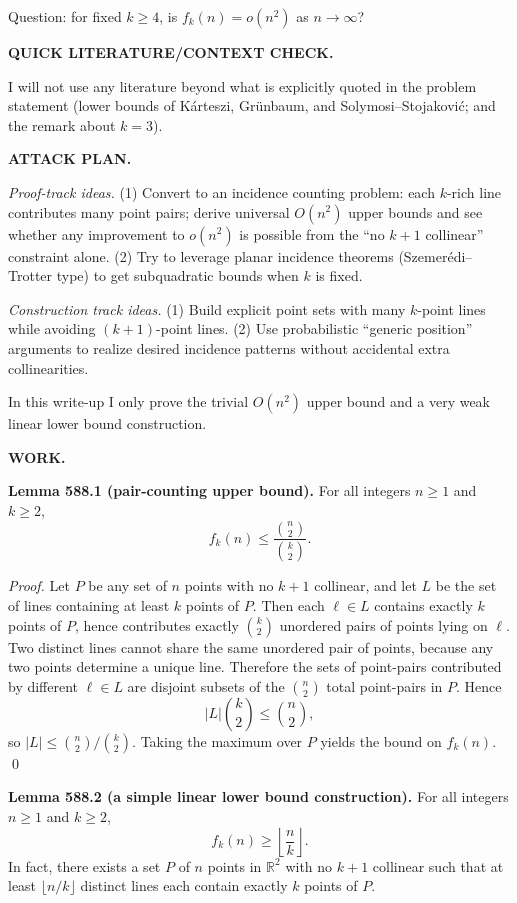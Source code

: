 Question: for fixed $k\ge 4$, is $f_k(n)=o(n^2)$ as $n\to\infty$?

\bigskip
\noindent\textbf{QUICK LITERATURE/CONTEXT CHECK.}

I will not use any literature beyond what is explicitly quoted in the problem statement (lower bounds of K\'arteszi, Gr\"unbaum, and Solymosi--Stojakovi\'c; and the remark about $k=3$).

\bigskip
\noindent\textbf{ATTACK PLAN.}

\emph{Proof-track ideas.}
(1) Convert to an incidence counting problem: each $k$-rich line contributes many point pairs; derive universal $O(n^2)$ upper bounds and see whether any improvement to $o(n^2)$ is possible from the ``no $k+1$ collinear'' constraint alone.
(2) Try to leverage planar incidence theorems (Szemer\'edi--Trotter type) to get subquadratic bounds when $k$ is fixed.

\emph{Construction track ideas.}
(1) Build explicit point sets with many $k$-point lines while avoiding $(k+1)$-point lines.
(2) Use probabilistic ``generic position'' arguments to realize desired incidence patterns without accidental extra collinearities.

In this write-up I only prove the trivial $O(n^2)$ upper bound and a very weak linear lower bound construction.

\bigskip
\noindent\textbf{WORK.}

\noindent\textbf{Lemma 588.1 (pair-counting upper bound).}
For all integers $n\ge 1$ and $k\ge 2$,
\[
 f_k(n)\le \frac{\binom{n}{2}}{\binom{k}{2}}.
\]

\noindent\emph{Proof.}
Let $P$ be any set of $n$ points with no $k+1$ collinear, and let $L$ be the set of lines containing at least $k$ points of $P$.
Then each $\ell\in L$ contains exactly $k$ points of $P$, hence contributes exactly $\binom{k}{2}$ unordered pairs of points lying on $\ell$.
Two distinct lines cannot share the same unordered pair of points, because any two points determine a unique line.
Therefore the sets of point-pairs contributed by different $\ell\in L$ are disjoint subsets of the $\binom{n}{2}$ total point-pairs in $P$.
Hence
\[
 |L|\binom{k}{2}\le \binom{n}{2},
\]
so $|L|\le \binom{n}{2}/\binom{k}{2}$.
Taking the maximum over $P$ yields the bound on $f_k(n)$.
\qed

\bigskip
\noindent\textbf{Lemma 588.2 (a simple linear lower bound construction).}
For all integers $n\ge 1$ and $k\ge 2$,
\[
 f_k(n)\ge \left\lfloor\frac nk\right\rfloor.
\]
In fact, there exists a set $P$ of $n$ points in $\mathbb{R}^2$ with no $k+1$ collinear such that at least $\lfloor n/k\rfloor$ distinct lines each contain exactly $k$ points of $P$.


